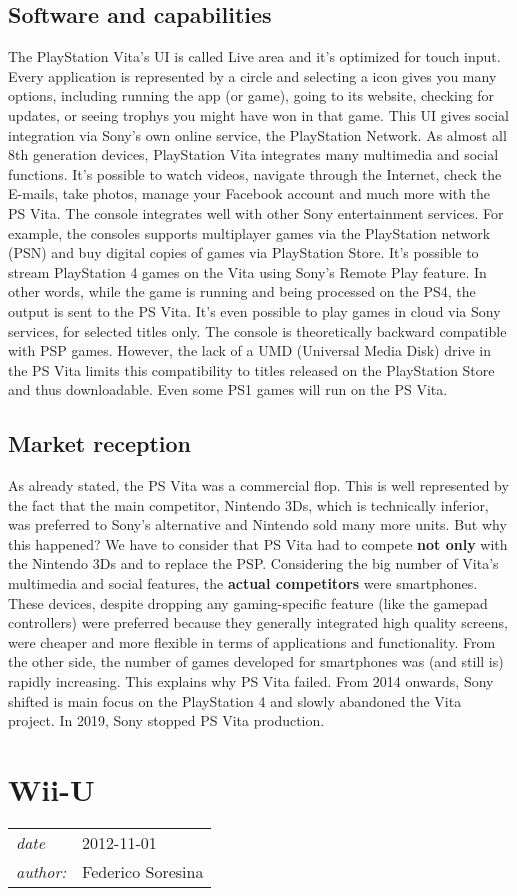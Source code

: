 \documentclass[a4paper,10pt]{book}
\newcommand{\pageHeader}[4]{
    \section{#1}
    \vspace{-0.3cm}
    \begin{table}[h!]
     \begin{tabular}{ll}
        \hline
        \textit{date} & #2 \\
        \textit{author: } & #3\\
        \hline
     \end{tabular}
    \end{table}
    \vspace{-0.3cm}
}
\begin{document}
 \subsection{ Software and capabilities  }
  The PlayStation Vita's UI is called Live area and it's optimized for touch input. Every application is represented by a circle and selecting a icon gives you many options, including running the app (or game), going to its website, checking for updates, or seeing trophys you might have won in that game. This UI gives social integration via Sony's own online service, the PlayStation Network.  
  As almost all 8th generation devices, PlayStation Vita integrates many multimedia and social functions. It's possible to watch videos, navigate through the Internet, check the E-mails, take photos, manage your Facebook account and much more with the PS Vita.  
  The console integrates well with other Sony entertainment services. For example, the consoles supports multiplayer games via the PlayStation network (PSN) and buy digital copies of games via PlayStation Store.  
  It's possible to stream PlayStation 4 games on the Vita using Sony's Remote Play feature. In other words, while the game is running and being processed on the PS4, the output is sent to the PS Vita. It's even possible to play games in cloud via Sony services, for selected titles only.  
  The console is theoretically backward compatible with PSP games. However, the lack of a UMD (Universal Media Disk) drive in the PS Vita limits this compatibility to titles released on the PlayStation Store and thus downloadable. Even some PS1 games will run on the PS Vita.  
 \subsection{ Market reception  }
  As already stated, the PS Vita was a commercial flop. This is well represented by the fact that the main competitor, Nintendo 3Ds, which is technically inferior, was preferred to Sony's alternative and Nintendo sold many more units. But why this happened?  
  We have to consider that PS Vita had to compete  \textbf{ not only  }  with the Nintendo 3Ds and to replace the PSP. Considering the big number of Vita's multimedia and social features, the  \textbf{ actual competitors  }  were smartphones. These devices, despite dropping any gaming-specific feature (like the gamepad controllers) were preferred because they generally integrated high quality screens, were cheaper and more flexible in terms of applications and functionality. From the other side, the number of games developed for smartphones was (and still is) rapidly increasing. This explains why PS Vita failed.  
  From 2014 onwards, Sony shifted is main focus on the PlayStation 4 and slowly abandoned the Vita project. In 2019, Sony stopped PS Vita production.  
 \newpage\pageHeader{Wii-U}{2012-11-01}{Federico Soresina}{Wii-U page description}
\end{document}
